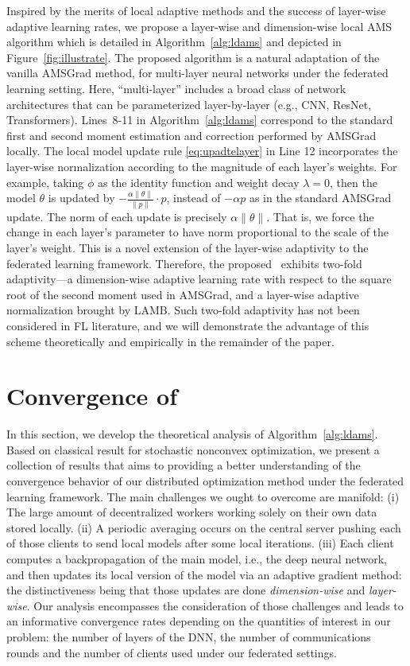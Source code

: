 \documentclass[nohyperref]{article}
\begin{document}
Inspired by the merits of local adaptive methods and the success of layer-wise adaptive learning rates, we propose a layer-wise and dimension-wise local AMS algorithm which is detailed in Algorithm~\ref{alg:ldams} and  depicted in Figure~\ref{fig:illustrate}. 
The proposed algorithm is a natural adaptation of the vanilla AMSGrad method, for multi-layer neural networks under the federated learning setting. Here, ``multi-layer'' includes a broad class of network architectures that can be parameterized layer-by-layer (e.g., CNN, ResNet, Transformers). Lines~8-11 in Algorithm~\ref{alg:ldams} correspond to the standard first and second moment estimation and correction performed by AMSGrad locally. The local model update rule \eqref{eq:upadtelayer} in Line 12 incorporates the layer-wise normalization according to the magnitude of each layer's weights. For example, taking $\phi$ as the identity function and weight decay $\lambda=0$, then the model $\theta$ is updated by $-\frac{\alpha \| \theta\|}{\|p\|}\cdot p$, instead of $-\alpha p$ as in the standard AMSGrad update. The norm of each update is precisely $\alpha \|\theta\|$. That is, we force the change in each layer's parameter to have norm proportional to the scale of the layer's weight. This is a novel extension of the layer-wise adaptivity to the federated learning framework. Therefore, the proposed \algo\ exhibits two-fold adaptivity---a dimension-wise adaptive learning rate with respect to the square root of the second moment used in AMSGrad, and a layer-wise adaptive normalization brought by LAMB. Such two-fold adaptivity has not been considered in FL literature, and we will demonstrate the advantage of this scheme theoretically and empirically in the remainder of the paper.




\section{Convergence of \algo}\label{sec:theory}
In this section, we develop the theoretical analysis of Algorithm~\ref{alg:ldams}.  Based on classical result for stochastic nonconvex optimization, we present a collection of results that aims to providing a better understanding of the convergence behavior of our distributed optimization method under the federated learning framework.
The main challenges we ought to overcome are manifold:
(i) The large amount of decentralized workers working solely on their own data stored locally. 
(ii) A periodic averaging occurs on the central server pushing each of those clients to send local models after some local iterations. 
(iii) Each client computes a backpropagation of the main model, i.e., the deep neural network, and then updates its local version of the model via an adaptive gradient method: the distinctiveness being that those updates are done \emph{dimension-wise} and \emph{layer-wise}.
Our analysis encompasses the consideration of those challenges and leads to an informative convergence rates depending on the quantities of interest in our problem: the number of layers of the DNN, the number of communications rounds and the number of clients used under our federated settings.
\end{document}
